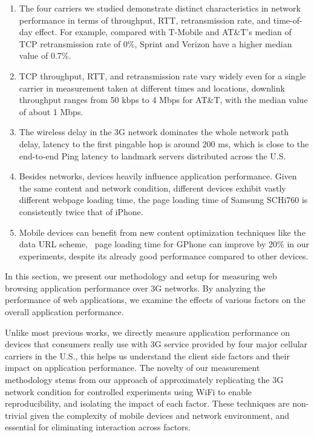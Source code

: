 \begin{enumerate}%

\item The four carriers we studied demonstrate distinct 
characteristics in network performance in terms of throughput, RTT, 
retransmission rate, and time-of-day effect. For example, compared 
with T-Mobile and AT\&T's median of TCP retransmission rate of 
0\%, Sprint and Verizon have a higher median value of 0.7\%. 

\item TCP throughput, RTT, and retransmission rate vary widely even
for a single carrier in measurement taken at different times and 
locations, \eg downlink throughput ranges from 50 kbps to 4 Mbps for 
AT\&T, with the median value of about 1 Mbps.

\item The wireless delay in the 3G network dominates the whole
network path delay, \eg latency to the first pingable hop is around 
200 ms, which is close to the end-to-end Ping latency to landmark
servers distributed across the U.S.

\item Besides networks, devices heavily influence application 
performance. Given the same content and network condition, different 
devices exhibit vastly different webpage loading time, \eg the
page loading time of Samsung SCHi760 is consistently twice that of 
iPhone. 

\item Mobile devices can benefit from new content optimization
techniques like the data URL scheme, \eg~page loading time for 
GPhone can improve by 20\% in our experiments, despite 
its already good performance compared to other devices.
\end{enumerate}

\label{sec:app.method}

In this section, we present our methodology and setup for measuring web browsing application performance over 3G networks. By analyzing the performance of web applications, we examine the effects of various factors on the overall application performance.

Unlike most previous works, we directly measure application 
performance on devices that consumers really use with 3G service 
provided by four major cellular carriers in the U.S., this helps us 
understand the client side factors and their impact on application 
performance. The novelty of our measurement methodology stems from 
our approach of approximately replicating the 3G network condition 
for controlled experiments using WiFi to enable reproducibility, 
and isolating the impact of each factor. These techniques are 
non-trivial given the complexity of mobile devices and network 
environment, and essential for eliminating interaction across factors. 

